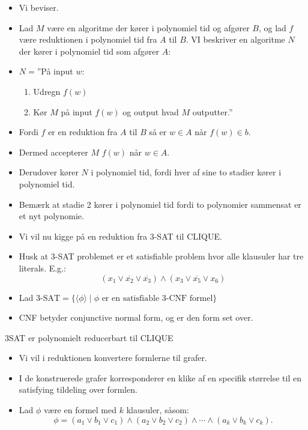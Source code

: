 \begin{frame}[allowframebreaks]
	\begin{itemize}
		\item Vi beviser.
		\item Lad $M$ være en algoritme der kører i polynomiel tid og afgører $B$, og lad $f$ være reduktionen i polynomiel tid fra $A$ til $B$. VI beskriver en algoritme $N$ der kører i polynomiel tid som afgører $A$:
		\item $N =$''På input $w$:
		      \begin{enumerate}
			      \item Udregn $f(w)$
			      \item Kør $M$ på input $f(w)$ og output hvad $M$ outputter.''
		      \end{enumerate}
		\item Fordi $f$ er en reduktion fra $A$ til $B$ så er $w \in A$ når $f(w) \in b$.
		\item Dermed accepterer $M$ $f(w)$ når $w \in A$.
		\item Derudover kører $N$ i polynomiel tid, fordi hver af sine to stadier kører i polynomiel tid.
		\item Bemærk at stadie 2 kører i polynomiel tid fordi to polynomier sammensat er et nyt polynomie.
		\item Vi vil nu kigge på en reduktion fra $3$-SAT til CLIQUE.
		\item Husk at $3$-SAT problemet er et satisfiable problem hvor alle klausuler har tre literals. E.g.:
		      \begin{equation}
			      (x_{1} \lor \overline{x_{2}} \lor \overline{x_{3}}) \land (x_{3} \lor \overline{x_{5}} \lor x_{6})
		      \end{equation}
		\item Lad $\text{3-SAT} = \{\langle \phi  \rangle \mid \phi \text{ er en satisfiable 3-CNF formel}\}$
		\item CNF betyder conjunctive normal form, og er den form set over.
	\end{itemize}

	\begin{theorem}
		3SAT er polynomielt reducerbart til CLIQUE
	\end{theorem}

	\begin{itemize}
		\item Vi vil i reduktionen konvertere formlerne til grafer.
		\item I de konstruerede grafer korresponderer en klike af en specifik størrelse til en satisfying tildeling over formlen.
		\item Lad $\phi$ være en formel med $k$ klausuler, såsom:
		      \begin{equation}
			      \phi = (a_1 \lor b_1 \lor c_1) \land (a_2 \lor b_2 \lor c_2) \land \cdots \land (a_k \lor b_k \lor c_k).
		      \end{equation}


\end{itemize}
\end{frame}
